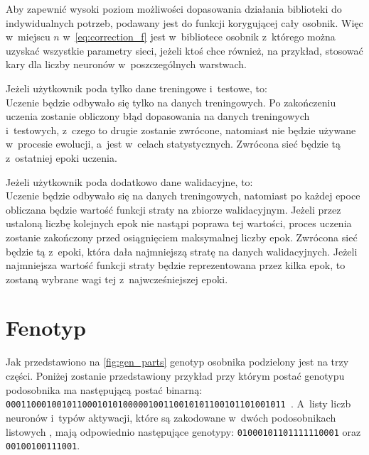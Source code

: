 Aby zapewnić wysoki poziom możliwości
dopasowania działania biblioteki
do indywidualnych potrzeb,
podawany jest do funkcji korygującej cały osobnik.
Więc w~miejscu $n$ w~\cref{eq:correction_f}
jest w~bibliotece osobnik z~którego można
uzyskać wszystkie parametry sieci,
jeżeli ktoś chce również, na przykład,
stosować kary dla liczby neuronów
w~poszczególnych warstwach.

Jeżeli użytkownik poda tylko
dane treningowe i~testowe, to:\\
Uczenie będzie odbywało się tylko na danych treningowych.
Po zakończeniu uczenia zostanie obliczony błąd
dopasowania na danych treningowych i~testowych,
z~czego to drugie zostanie zwrócone,
natomiast nie będzie używane w~procesie ewolucji,
a~jest w~celach statystycznych.
Zwrócona sieć będzie tą z~ostatniej epoki uczenia.

Jeżeli użytkownik poda dodatkowo dane walidacyjne, to:\\
Uczenie będzie odbywało się na danych treningowych,
natomiast po każdej epoce obliczana będzie wartość
funkcji straty na zbiorze walidacyjnym.
Jeżeli przez ustaloną liczbę kolejnych
epok nie nastąpi poprawa tej wartości,
proces uczenia zostanie zakończony
przed osiągnięciem maksymalnej liczby epok.
Zwrócona sieć będzie tą z~epoki,
która dała najmniejszą stratę na danych walidacyjnych.
Jeżeli najmniejsza wartość funkcji straty
będzie reprezentowana przez kilka epok,
to zostaną wybrane wagi tej z~najwcześniejszej epoki.

\section{Fenotyp}
\label{sec:fenotype}
Jak przedstawiono na \cref{fig:gen_parts}
genotyp osobnika podzielony jest na trzy części.
Poniżej zostanie przedstawiony przykład
przy którym postać genotypu podosobnika
\textbf{}
ma następującą postać binarną: \texttt{%
  0001100010010110001010100000100110010101100101101001011%
}. A~listy liczb neuronów i~typów aktywacji,
które są zakodowane w~dwóch podosobnikach listowych
\textbf{},
mają odpowiednio następujące genotypy:
\texttt{01000101101111110001}
oraz \texttt{00100100111001}.

